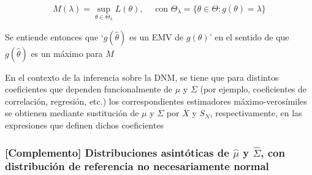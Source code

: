 \documentclass[11pt,a4paper]{article}
\begin{document}
$$M(\lambda)=\sup\limits_{\theta \in \Theta_{\lambda}} L(\theta), \quad \text{ con } \Theta_{\lambda}=\{\theta \in \Theta: g(\theta)=\lambda\}$$

Se entiende entonces que `$g(\hat{\theta})$ es un EMV de $g(\theta)$' en el sentido de que $g(\hat{\theta})$ es un máximo para $M$

En el contexto de la inferencia sobre la DNM, se tiene que para distintos coeficientes que dependen funcionalmente de $\mu$ y $\Sigma$ (por ejemplo, coeficientes de correlación, regresión, etc.) los correspondientes estimadores máximo-verosímiles se obtienen mediante sustitución de $\mu$ y $\Sigma$ por $\overline{X}$ y $S_{N}$, respectivamente, en las expresiones que definen dichos coeficientes

\subsubsection{[Complemento] Distribuciones asintóticas de \texorpdfstring{$\hat{\mu}$}) y \texorpdfstring{$\hat{\Sigma}$}), con distribución de referencia no necesariamente normal}
\end{document}
